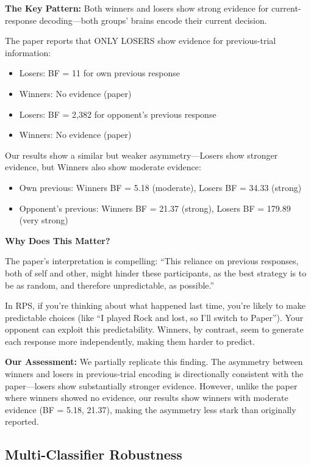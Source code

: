 \documentclass[11pt,a4paper]{article}
\begin{document}
\textbf{The Key Pattern:}
Both winners and losers show strong evidence for current-response decoding---both groups' brains encode their current decision.

The paper reports that ONLY LOSERS show evidence for previous-trial information:
\begin{itemize}
    \item Losers: BF = 11 for own previous response
    \item Winners: No evidence (paper)
    \item Losers: BF = 2,382 for opponent's previous response
    \item Winners: No evidence (paper)
\end{itemize}

Our results show a similar but weaker asymmetry---Losers show stronger evidence, but Winners also show moderate evidence:
\begin{itemize}
    \item Own previous: Winners BF = 5.18 (moderate), Losers BF = 34.33 (strong)
    \item Opponent's previous: Winners BF = 21.37 (strong), Losers BF = 179.89 (very strong)
\end{itemize}

\textbf{Why Does This Matter?}

The paper's interpretation is compelling: ``This reliance on previous responses, both of self and other, might hinder these participants, as the best strategy is to be as random, and therefore unpredictable, as possible.''

In RPS, if you're thinking about what happened last time, you're likely to make predictable choices (like ``I played Rock and lost, so I'll switch to Paper''). Your opponent can exploit this predictability. Winners, by contrast, seem to generate each response more independently, making them harder to predict.

\textbf{Our Assessment:}
We partially replicate this finding. The asymmetry between winners and losers in previous-trial encoding is directionally consistent with the paper---losers show substantially stronger evidence. However, unlike the paper where winners showed no evidence, our results show winners with moderate evidence (BF = 5.18, 21.37), making the asymmetry less stark than originally reported.

\subsection{Multi-Classifier Robustness}
\label{subsec:multiclassifier}
\end{document}
